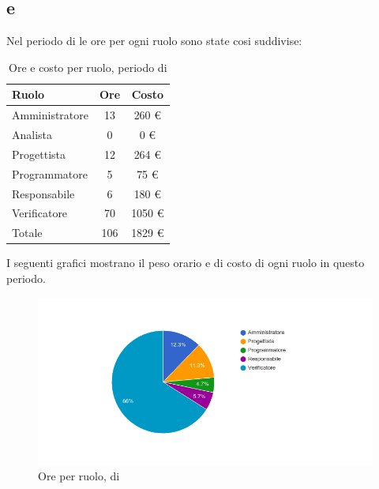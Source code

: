 \subsection{ e }
Nel periodo di  le ore per ogni ruolo sono state cosi suddivise:

\begin{table}[H]
	\centering
	\begin{tabular}{ l c c }
		\textbf{Ruolo} & \textbf{Ore} & \textbf{Costo} \\
		\hline
		Amministratore & 13 & 260 \euro{} \\
		Analista & 0 & 0 \euro{} \\
		Progettista & 12 & 264 \euro{} \\
		Programmatore & 5 & 75 \euro{} \\
		Responsabile & 6 & 180 \euro{} \\
		Verificatore & 70 & 1050 \euro{} \\
		\hline
		Totale & 106 & 1829 \euro{} \\
		\hline
	\end{tabular}
	\caption{Ore e costo per ruolo, periodo di }
\end{table}

I seguenti grafici mostrano il peso orario e di costo di ogni ruolo in questo periodo.

\begin{figure}[H]
  \begin{center}
    \includegraphics[width=15cm]{res/img/prospettoEconomico/orePerRuoloValidazione.png}
  \caption{Ore per ruolo,  di }
  \end{center} 
\end{figure}  

